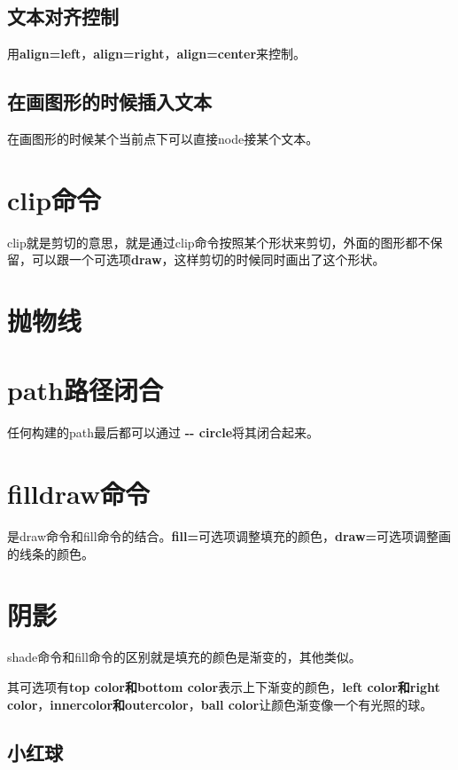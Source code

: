 \documentclass[11pt,oneside]{book}
\begin{document}
\begin{common-format}
\subsection{文本对齐控制}
用\textbf{align=left}，\textbf{align=right}，\textbf{align=center}来控制。

\subsection{在画图形的时候插入文本}

在画图形的时候某个当前点下可以直接node接某个文本。





\section{clip命令}
clip就是剪切的意思，就是通过clip命令按照某个形状来剪切，外面的图形都不保留，可以跟一个可选项\textbf{draw}，这样剪切的时候同时画出了这个形状。


\section{抛物线}

\section{path路径闭合}
任何构建的path最后都可以通过\textbf{ -{}- circle}将其闭合起来。

\section{filldraw命令}
是draw命令和fill命令的结合。\textbf{fill=}可选项调整填充的颜色，\textbf{draw=}可选项调整画的线条的颜色。

\section{阴影}
shade命令和fill命令的区别就是填充的颜色是渐变的，其他类似。

其可选项有\textbf{top color和bottom color}表示上下渐变的颜色，\textbf{left color和right color}，\textbf{innercolor和outercolor}，\textbf{ball color}让颜色渐变像一个有光照的球。

\subsection{小红球}



\end{common-format}
\end{document}
